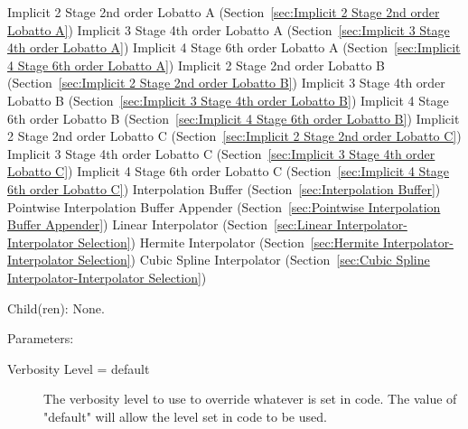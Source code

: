 \begin{list}{}
    Implicit 2 Stage 2nd order Lobatto A (Section~\ref{sec:Implicit 2 Stage 2nd order Lobatto A})
      \newline 
    Implicit 3 Stage 4th order Lobatto A (Section~\ref{sec:Implicit 3 Stage 4th order Lobatto A})
      \newline 
    Implicit 4 Stage 6th order Lobatto A (Section~\ref{sec:Implicit 4 Stage 6th order Lobatto A})
      \newline 
    Implicit 2 Stage 2nd order Lobatto B (Section~\ref{sec:Implicit 2 Stage 2nd order Lobatto B})
      \newline 
    Implicit 3 Stage 4th order Lobatto B (Section~\ref{sec:Implicit 3 Stage 4th order Lobatto B})
      \newline 
    Implicit 4 Stage 6th order Lobatto B (Section~\ref{sec:Implicit 4 Stage 6th order Lobatto B})
      \newline 
    Implicit 2 Stage 2nd order Lobatto C (Section~\ref{sec:Implicit 2 Stage 2nd order Lobatto C})
      \newline 
    Implicit 3 Stage 4th order Lobatto C (Section~\ref{sec:Implicit 3 Stage 4th order Lobatto C})
      \newline 
    Implicit 4 Stage 6th order Lobatto C (Section~\ref{sec:Implicit 4 Stage 6th order Lobatto C})
      \newline 
    Interpolation Buffer (Section~\ref{sec:Interpolation Buffer})
      \newline 
    Pointwise Interpolation Buffer Appender (Section~\ref{sec:Pointwise Interpolation Buffer Appender})
      \newline 
    Linear Interpolator (Section~\ref{sec:Linear Interpolator-Interpolator Selection})
      \newline 
    Hermite Interpolator (Section~\ref{sec:Hermite Interpolator-Interpolator Selection})
      \newline 
    Cubic Spline Interpolator (Section~\ref{sec:Cubic Spline Interpolator-Interpolator Selection})
  \item[Child(ren):]
    None. 
  \item[Parameters:]
    \begin{description}
      \item[Verbosity Level = default] 
The verbosity level to use to override whatever is set in code.
The value of "default" will allow the level set in code to be used.


\end{description}
\end{list}
